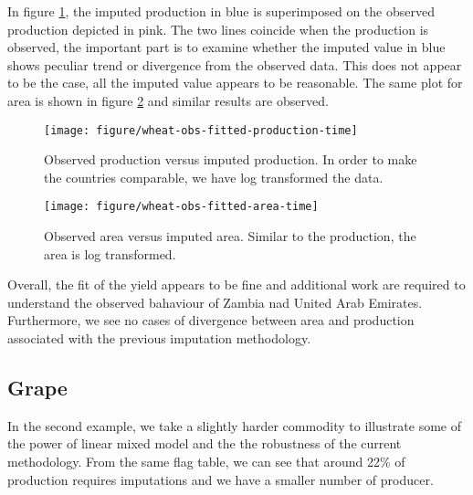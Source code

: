 \documentclass[nojss]{jss}\usepackage[]{graphicx}\usepackage[]{color}
\makeatletter
\def\maxwidth{ %
  \ifdim\Gin@nat@width>\linewidth
    \linewidth
  \else
    \Gin@nat@width
  \fi
}
\newenvironment{knitrout}{}{} %
\makeatother
\begin{document}
In figure \ref{fig:wheat-obs-fitted-production-time}, the imputed
production in blue is superimposed on the observed production depicted
in pink. The two lines coincide when the production is observed, the
important part is to examine whether the imputed value in blue shows
peculiar trend or divergence from the observed data. This does not
appear to be the case, all the imputed value appears to be
reasonable. The same plot for area is shown in figure
\ref{fig:wheat-obs-fitted-area-time} and similar results are observed.

\begin{knitrout}
\color{fgcolor}\begin{figure}[!ht]


{\centering \texttt{[image: figure/wheat-obs-fitted-production-time]} 

}

\caption[Observed production versus imputed production]{Observed production versus imputed production. In order to make the countries comparable, we have log transformed the data.\label{fig:wheat-obs-fitted-production-time}}
\end{figure}


\end{knitrout}


\begin{knitrout}
\color{fgcolor}\begin{figure}[!ht]


{\centering \texttt{[image: figure/wheat-obs-fitted-area-time]} 

}

\caption[Observed area versus imputed area]{Observed area versus imputed area. Similar to the production, the area is log transformed.\label{fig:wheat-obs-fitted-area-time}}
\end{figure}


\end{knitrout}


Overall, the fit of the yield appears to be fine and additional work
are required to understand the observed bahaviour of Zambia nad United
Arab Emirates. Furthermore, we see no cases of divergence between area
and production associated with the previous imputation methodology.


\FloatBarrier
\subsection{Grape}
In the second example, we take a slightly harder commodity to
illustrate some of the power of linear mixed model and the the
robustness of the current methodology. From the same flag table, we
can see that around 22\% of production requires imputations and we
have a smaller number of producer.
\end{document}
